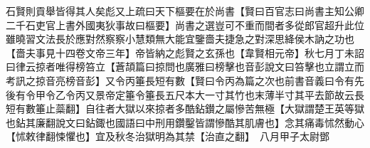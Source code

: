 石賢則貢舉皆得其人矣彪又上疏曰天下樞要在於尚書【賢曰百官志曰尚書主知公卿二千石吏官上書外國夷狄事故曰樞要】尚書之選豈可不重而間者多從郎官超升此位雖曉習文法長於應對然察察小慧類無大能宜鑒嗇夫捷急之對深思絳侯木訥之功也【嗇夫事見十四卷文帝三年】帝皆納之彪賢之玄孫也【韋賢相元帝】秋七月丁未詔曰律云掠者唯得榜笞立【蒼頡篇曰掠問也廣雅曰榜擊也音彭說文曰笞擊也立謂立而考訊之掠音亮榜音彭】又令丙箠長短有數【賢曰令丙為篇之次也前書音義曰令有先後有令甲令乙令丙又景帝定箠令箠長五尺本大一寸其竹也末薄半寸其平去節故云長短有數箠止蘂翻】自往者大獄以來掠者多酷鉆鑚之屬慘苦無極【大獄謂楚王英等獄也鉆其廉翻說文曰鉆鋷也國語曰中刑用鑽鑿皆謂慘酷其肌膚也】念其痛毒怵然動心【怵敕律翻悚懼也】宜及秋冬治獄明為其禁【治直之翻】　八月甲子太尉鄧